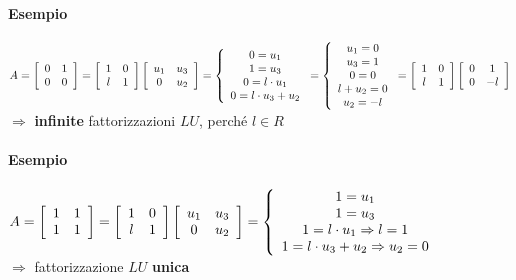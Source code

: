 \documentclass[10pt]{book}
\begin{document}
\paragraph{Esempio} \begin{math}
A = \left[
\begin{array}{c c}
	0 & 1\\
	0 & 0
\end{array}
\right]
= \left[
\begin{array}{c c}
	1 & 0\\
	l & 1
\end{array}
\right]
\left[
\begin{array}{c c}
	u_1 & u_3\\
	0 & u_2
\end{array}
\right]
= \left\{
\begin{array}{c}
	0 = u_1\\
	1 = u_3\\
	0 = l\cdot u_1\\
	0 = l\cdot u_3 + u_2
\end{array}
\right.
= \left\{
\begin{array}{c}
	u_1 = 0\\
	u_3 = 1\\
	0 = 0\\
	l + u_2 = 0\\
	u_2 = -l
\end{array}
\right.
= \left[
\begin{array}{c c}
	1 & 0\\
	l & 1
\end{array}
\right]
\left[
\begin{array}{c c}
	0 & 1\\
	0 & -l
\end{array}
\right]
\end{math}\\
$\Rightarrow$ \textbf{infinite} fattorizzazioni $LU$, perché $l \in R$
\paragraph{Esempio} \begin{math}
A = \left[
\begin{array}{c c}
	1 & 1\\
	1 & 1
\end{array}
\right]
= \left[
\begin{array}{c c}
	1 & 0\\
	l & 1
\end{array}
\right]
\left[
\begin{array}{c c}
	u_1 & u_3\\
	0 & u_2
\end{array}
\right]
= \left\{
\begin{array}{c}
	1 = u_1\\
	1 = u_3\\
	1 = l\cdot u_1 \Rightarrow l = 1\\
	1 = l\cdot u_3 + u_2 \Rightarrow u_2 = 0
\end{array}
\right.
\end{math}\\
$\Rightarrow$ fattorizzazione $LU$ \textbf{unica}
\end{document}

